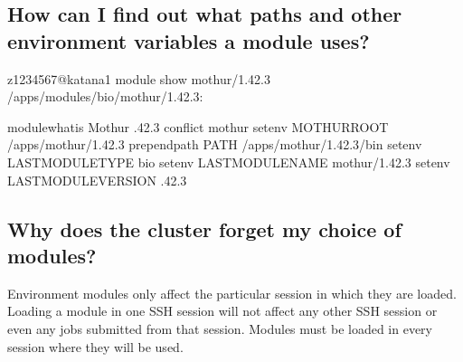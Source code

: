 \documentclass[letterpaper,10pt,english]{sphinxmanual}
\begin{document}
\subsection{How can I find out what paths and other environment variables a module uses?}
\label{\detokenize{software/environment_modules:how-can-i-find-out-what-paths-and-other-environment-variables-a-module-uses}}
\begin{sphinxVerbatim}[commandchars=\\\{\}]
\PYG{o}{[}z1234567@katana1 \PYGZti{}\PYG{o}{]}\PYGZdl{} module show mothur/1.42.3
\PYGZhy{}\PYGZhy{}\PYGZhy{}\PYGZhy{}\PYGZhy{}\PYGZhy{}\PYGZhy{}\PYGZhy{}\PYGZhy{}\PYGZhy{}\PYGZhy{}\PYGZhy{}\PYGZhy{}\PYGZhy{}\PYGZhy{}\PYGZhy{}\PYGZhy{}\PYGZhy{}\PYGZhy{}\PYGZhy{}\PYGZhy{}\PYGZhy{}\PYGZhy{}\PYGZhy{}\PYGZhy{}\PYGZhy{}\PYGZhy{}\PYGZhy{}\PYGZhy{}\PYGZhy{}\PYGZhy{}\PYGZhy{}\PYGZhy{}\PYGZhy{}\PYGZhy{}\PYGZhy{}\PYGZhy{}\PYGZhy{}\PYGZhy{}\PYGZhy{}\PYGZhy{}\PYGZhy{}\PYGZhy{}\PYGZhy{}\PYGZhy{}\PYGZhy{}\PYGZhy{}\PYGZhy{}\PYGZhy{}\PYGZhy{}\PYGZhy{}\PYGZhy{}\PYGZhy{}\PYGZhy{}\PYGZhy{}\PYGZhy{}\PYGZhy{}\PYGZhy{}\PYGZhy{}\PYGZhy{}\PYGZhy{}\PYGZhy{}\PYGZhy{}\PYGZhy{}\PYGZhy{}\PYGZhy{}\PYGZhy{}
/apps/modules/bio/mothur/1.42.3:

module\PYGZhy{}whatis     Mothur .42.3
conflict     mothur
setenv         MOTHUR\PYGZus{}ROOT /apps/mothur/1.42.3
prepend\PYGZhy{}path     PATH /apps/mothur/1.42.3/bin
setenv         LAST\PYGZus{}MODULE\PYGZus{}TYPE bio
setenv         LAST\PYGZus{}MODULE\PYGZus{}NAME mothur/1.42.3
setenv         LAST\PYGZus{}MODULE\PYGZus{}VERSION .42.3
\PYGZhy{}\PYGZhy{}\PYGZhy{}\PYGZhy{}\PYGZhy{}\PYGZhy{}\PYGZhy{}\PYGZhy{}\PYGZhy{}\PYGZhy{}\PYGZhy{}\PYGZhy{}\PYGZhy{}\PYGZhy{}\PYGZhy{}\PYGZhy{}\PYGZhy{}\PYGZhy{}\PYGZhy{}\PYGZhy{}\PYGZhy{}\PYGZhy{}\PYGZhy{}\PYGZhy{}\PYGZhy{}\PYGZhy{}\PYGZhy{}\PYGZhy{}\PYGZhy{}\PYGZhy{}\PYGZhy{}\PYGZhy{}\PYGZhy{}\PYGZhy{}\PYGZhy{}\PYGZhy{}\PYGZhy{}\PYGZhy{}\PYGZhy{}\PYGZhy{}\PYGZhy{}\PYGZhy{}\PYGZhy{}\PYGZhy{}\PYGZhy{}\PYGZhy{}\PYGZhy{}\PYGZhy{}\PYGZhy{}\PYGZhy{}\PYGZhy{}\PYGZhy{}\PYGZhy{}\PYGZhy{}\PYGZhy{}\PYGZhy{}\PYGZhy{}\PYGZhy{}\PYGZhy{}\PYGZhy{}\PYGZhy{}\PYGZhy{}\PYGZhy{}\PYGZhy{}\PYGZhy{}\PYGZhy{}\PYGZhy{}
\end{sphinxVerbatim}


\subsection{Why does the cluster forget my choice of modules?}
\label{\detokenize{software/environment_modules:why-does-the-cluster-forget-my-choice-of-modules}}
Environment modules only affect the particular session in which they are loaded. Loading a module in one SSH session will not affect any other SSH session or even any jobs submitted from that session. Modules must be loaded in every session where they will be used.
\end{document}

